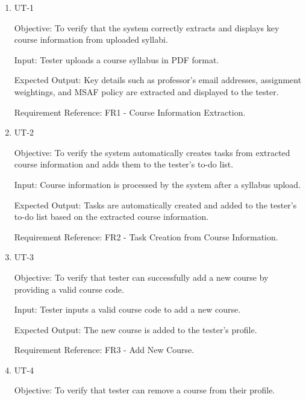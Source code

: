 \documentclass[12pt, titlepage]{article}
\begin{document}
\begin{enumerate}
\begin{enumerate}
    
    \item{UT-1\\}\label{UT-1}
    
        Objective: To verify that the system correctly extracts and displays key course information from uploaded syllabi.
        
        Input: Tester uploads a course syllabus in PDF format.
        
        Expected Output: Key details such as professor's email addresses, assignment weightings, and MSAF policy are extracted and displayed to the tester.
        
        Requirement Reference: FR1 - Course Information Extraction.
        
    \item{UT-2\\}\label{UT-2}
    
        Objective: To verify the system automatically creates tasks from extracted course information and adds them to the tester's to-do list.
        
        Input: Course information is processed by the system after a syllabus upload.
        
        Expected Output: Tasks are automatically created and added to the tester's to-do list based on the extracted course information.
        
        Requirement Reference: FR2 - Task Creation from Course Information.
        
    \item{UT-3\\}\label{UT-3}
    
        Objective: To verify that tester can successfully add a new course by providing a valid course code.
        
        Input: Tester inputs a valid course code to add a new course.
        
        Expected Output: The new course is added to the tester's profile.
        
        Requirement Reference: FR3 - Add New Course.
        
    \item{UT-4\\}\label{UT-4}
    
        Objective: To verify that tester can remove a course from their profile.
        

\end{enumerate}
\end{enumerate}
\end{document}
